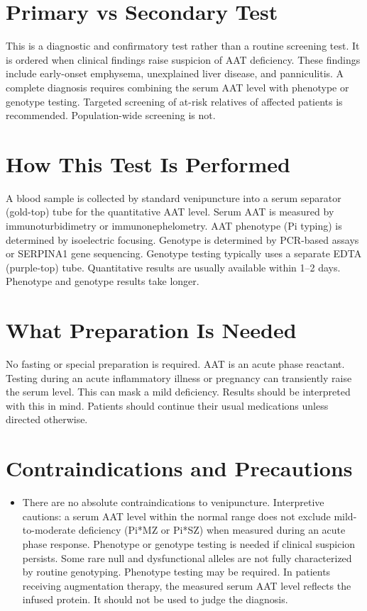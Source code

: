 \section*{Primary vs Secondary Test}
This is a diagnostic and confirmatory test rather than a routine screening test. It is ordered when clinical findings raise suspicion of AAT deficiency. These findings include early-onset emphysema, unexplained liver disease, and panniculitis. A complete diagnosis requires combining the serum AAT level with phenotype or genotype testing. Targeted screening of at-risk relatives of affected patients is recommended. Population-wide screening is not.
\section*{How This Test Is Performed}
A blood sample is collected by standard venipuncture into a serum separator (gold-top) tube for the quantitative AAT level. Serum AAT is measured by immunoturbidimetry or immunonephelometry. AAT phenotype (Pi typing) is determined by isoelectric focusing. Genotype is determined by PCR-based assays or SERPINA1 gene sequencing. Genotype testing typically uses a separate EDTA (purple-top) tube. Quantitative results are usually available within 1--2 days. Phenotype and genotype results take longer.
\section*{What Preparation Is Needed}
No fasting or special preparation is required. AAT is an acute phase reactant. Testing during an acute inflammatory illness or pregnancy can transiently raise the serum level. This can mask a mild deficiency. Results should be interpreted with this in mind. Patients should continue their usual medications unless directed otherwise.
\section*{Contraindications and Precautions}
\begin{itemize}
  \item There are no absolute contraindications to venipuncture. Interpretive cautions: a serum AAT level within the normal range does not exclude mild-to-moderate deficiency (Pi*MZ or Pi*SZ) when measured during an acute phase response. Phenotype or genotype testing is needed if clinical suspicion persists. Some rare null and dysfunctional alleles are not fully characterized by routine genotyping. Phenotype testing may be required. In patients receiving augmentation therapy, the measured serum AAT level reflects the infused protein. It should not be used to judge the diagnosis.
\end{itemize}
